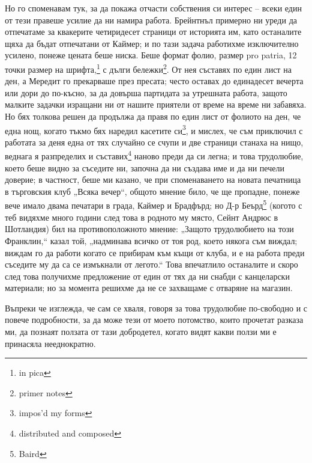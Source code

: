 \documentclass[12pt]{book}
\begin{document}
Но го споменавам тук, за да покажа отчасти собствения си интерес – всеки един от тези правеше усилие да ни намира работа. Брейнтнъл примерно ни уреди да отпечатаме за квакерите четиридесет страници от историята им, като останалите щяха да бъдат отпечатани от Каймер; и по тази задача работихме изключително усилено, понеже цената беше ниска. Беше формат фолио, размер pro patria, 12 точки размер на шрифта,\footnote{ in pica} с дълги бележки\footnote{primer notes}. От нея съставях по един лист на ден, а Мередит го прекарваше през пресата; често оставах до единадесет вечерта или дори до по-късно, за да довърша партидата за утрешната работа, защото малките задачки изращани ни от нашите приятели от време на време ни забавяха. Но бях толкова решен да продължа да правя по един лист от фолиото на ден, че една нощ, когато тъкмо бях наредил касетите си\footnote{impos'd my forms}, и мислех, че съм приключил с работата за деня една от тях случайно се счупи и две страници станаха на нищо, веднага я разпределих и съставих\footnote{distributed and composed} наново преди да си легна; и това трудолюбие, което беше видно за съседите ни, започна да ни създава име и да ни печели доверие; в частност, беше ми казано, че при споменаването на новата печатница в търговския клуб „Всяка вечер“, общото мнение било, че ще пропадне, понеже вече имало двама печатари в града, Каймер и Брадфърд; но Д-р Беърд\footnote{Baird } (когото с теб видяхме много години след това в родното му място, Сейнт Андрюс в Шотландия) бил на противоположното мнение: „Защото трудолюбието на този Франклин,“ казал той, „надминава всичко от тоя род, което някога съм виждал; виждам го да работи когато се прибирам към къщи от клуба, и е на работа преди съседите му да са се измъкнали от легото.“ Това впечатлило останалите и скоро след това получихме предложение от един от тях да ни снабди с канцеларски материали; но за момента решихме да не се захващаме с отваряне на магазин.

Въпреки че изглежда, че сам се хваля, говоря за това трудолюбие по-свободно и с повече подробности, за да може тези от моето потомство, които прочетат разказа ми, да познаят ползата от тази добродетел, когато видят какви ползи ми е принасяла нееднократно.
\end{document}
